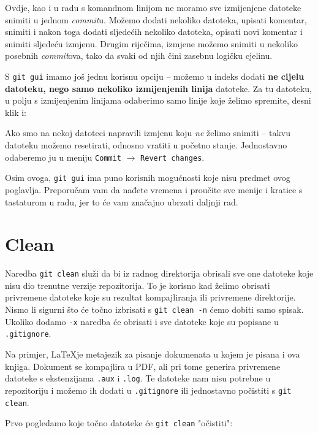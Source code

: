 Ovdje, kao i u radu s komandnom linijom ne moramo sve izmijenjene datoteke snimiti u jednom \emph{commit}u. 
Možemo dodati nekoliko datoteka, upisati komentar, snimiti i nakon toga dodati sljedećih nekoliko datoteka, opisati novi komentar i snimiti sljedeću izmjenu.
Drugim riječima, izmjene možemo snimiti u nekoliko posebnih \emph{commit}ova, tako da svaki od njih čini zasebnu logičku cjelinu.

S \verb+git gui+ imamo još jednu korisnu opciju -- možemo u indeks dodati \textbf{ne cijelu datoteku, nego samo nekoliko izmijenjenih linija} datoteke.
Za tu datoteku, u polju s izmijenjenim linijama odaberimo samo linije koje želimo spremite, desni klik i:


Ako smo na nekoj datoteci napravili izmjenu koju \emph{ne} želimo snimiti -- takvu datoteku možemo resetirati, odnosno vratiti u početno stanje. 
Jednostavno odaberemo ju u meniju \verb+Commit+ $\rightarrow$ \verb+Revert changes+.

Osim ovoga, \verb+git gui+ ima puno korisnih mogućnosti koje nisu predmet ovog poglavlja.
Preporučam vam da nađete vremena i proučite sve menije i kratice s tastaturom u radu, jer to će vam značajno ubrzati daljnji rad.

\section*{Clean}

Naredba \verb+git clean+ služi da bi iz radnog direktorija obrisali sve one datoteke koje nisu dio trenutne verzije repozitorija.
To je korisno kad želimo obrisati privremene datoteke koje su rezultat kompajliranja ili privremene direktorije.
Nismo li sigurni što će točno izbrisati s \verb+git clean -n+ ćemo dobiti samo spisak.
Ukoliko dodamo \verb+-x+ naredba će obrisati i sve datoteke koje su popisane u \verb+.gitignore+.

Na primjer, \LaTeX je metajezik za pisanje dokumenata u kojem je pisana i ova knjiga.
Dokument se kompajlira u PDF, ali pri tome generira privremene datoteke s ekstenzijama \verb+.aux+ i \verb+.log+.
Te datoteke nam nisu potrebne u repozitoriju i možemo ih dodati u \verb+.gitignore+ ili jednostavno počistiti s \verb+git clean+.

Prvo pogledamo koje točno datoteke će \verb+git clean+ "očistiti":



